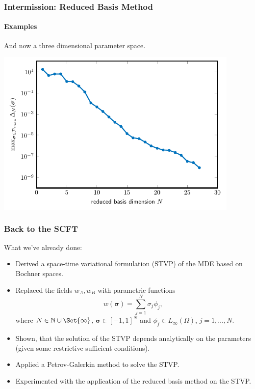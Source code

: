 \begin{frame}[t]
    \frametitle{Intermission: Reduced Basis Method}
    \framesubtitle{Examples}

    And now a three dimensional parameter space.

    \centering
    \includegraphics[width=0.9\textwidth]{figures/3dplot.pdf}
\end{frame}


\begin{frame}[t]
    \frametitle{Back to the SCFT}

    What we've already done:

    \begin{itemize}
        \item<1-> Derived a space-time variational formulation (STVP) of the MDE based on Bochner spaces.
        \item<2-> Replaced the fields $w_A, w_B$ with parametric functions
        \begin{equation}
            w(\bm \sigma) = \sum_{j = 1}^{N} \sigma_{j} \phi_{j},
        \end{equation}
        where $N \in \mathbb{N} \cup \Set{ \infty }$, $\bm \sigma \in [-1, 1]^{N}$ and $\phi_{j} \in L_{\infty}(\Omega)$, $j = 1, \dots, N$.
        \item<2-> Shown, that the solution of the STVP depends analytically on the parameters (given some restrictive sufficient conditions).
        \item<3-> Applied a Petrov-Galerkin method to solve the STVP.
        \item<3-> Experimented with the application of the reduced basis method on the STVP.
    \end{itemize}

\end{frame}

